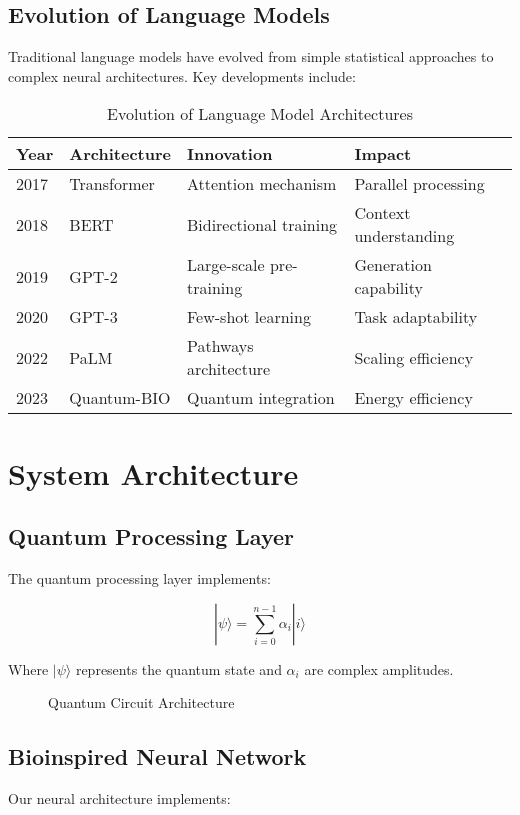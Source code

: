 \documentclass[conference]{IEEEtran}
\begin{document}
\subsection{Evolution of Language Models}
Traditional language models have evolved from simple statistical approaches to complex neural architectures. Key developments include:

\begin{table}[h]
\caption{Evolution of Language Model Architectures}
\begin{tabular}{@{}llll@{}}
\toprule
Year & Architecture & Innovation & Impact \\
\midrule
2017 & Transformer & Attention mechanism & Parallel processing \\
2018 & BERT & Bidirectional training & Context understanding \\
2019 & GPT-2 & Large-scale pre-training & Generation capability \\
2020 & GPT-3 & Few-shot learning & Task adaptability \\
2022 & PaLM & Pathways architecture & Scaling efficiency \\
2023 & Quantum-BIO & Quantum integration & Energy efficiency \\
\bottomrule
\end{tabular}
\end{table}

\section{System Architecture}
\subsection{Quantum Processing Layer}
The quantum processing layer implements:

\begin{equation}
|\psi\rangle = \sum_{i=0}^{n-1} \alpha_i |i\rangle
\end{equation}

Where $|\psi\rangle$ represents the quantum state and $\alpha_i$ are complex amplitudes.

\begin{figure}[h]
\centering
\begin{tikzpicture}
\end{tikzpicture}
\caption{Quantum Circuit Architecture}
\end{figure}

\subsection{Bioinspired Neural Network}
Our neural architecture implements:
\end{document}
